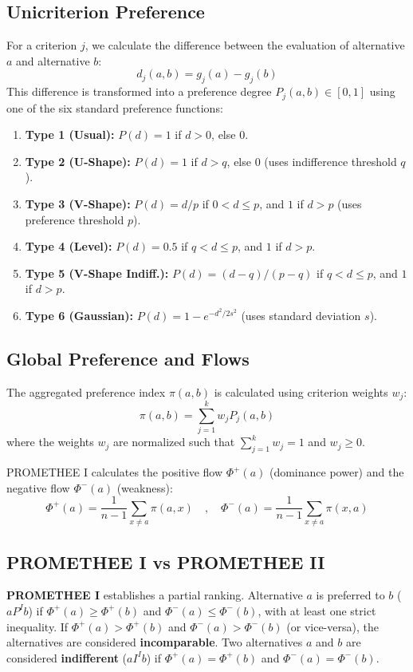 \documentclass[12pt,a4paper,oneside]{report}
\begin{document}
\subsection{Unicriterion Preference}
For a criterion $j$, we calculate the difference between the evaluation of alternative $a$ and alternative $b$:
\begin{equation}
    d_j(a, b) = g_j(a) - g_j(b)
\end{equation}
This difference is transformed into a preference degree $P_j(a,b) \in [0, 1]$ using one of the six standard preference functions:
\begin{enumerate}
    \item \textbf{Type 1 (Usual):} $P(d) = 1$ if $d > 0$, else $0$.
    \item \textbf{Type 2 (U-Shape):} $P(d) = 1$ if $d > q$, else $0$ (uses indifference threshold $q$).
    \item \textbf{Type 3 (V-Shape):} $P(d) = d/p$ if $0 < d \le p$, and $1$ if $d > p$ (uses preference threshold $p$).
    \item \textbf{Type 4 (Level):} $P(d) = 0.5$ if $q < d \le p$, and $1$ if $d > p$.
    \item \textbf{Type 5 (V-Shape Indiff.):} $P(d) = (d-q)/(p-q)$ if $q < d \le p$, and $1$ if $d > p$.
    \item \textbf{Type 6 (Gaussian):} $P(d) = 1 - e^{-d^2/2s^2}$ (uses standard deviation $s$).
\end{enumerate}

\subsection{Global Preference and Flows}
The aggregated preference index $\pi(a,b)$ is calculated using criterion weights $w_j$:
\begin{equation}
    \pi(a, b) = \sum_{j=1}^{k} w_j P_j(a, b)
\end{equation}
where the weights $w_j$ are normalized such that $\sum_{j=1}^{k} w_j = 1$ and $w_j \geq 0$.

PROMETHEE I calculates the positive flow $\Phi^+(a)$ (dominance power) and the negative flow $\Phi^-(a)$ (weakness):
\begin{equation}
    \Phi^+(a) = \frac{1}{n-1} \sum_{x \neq a} \pi(a, x) \quad , \quad \Phi^-(a) = \frac{1}{n-1} \sum_{x \neq a} \pi(x, a)
\end{equation}

\subsection{PROMETHEE I vs PROMETHEE II}
\textbf{PROMETHEE I} establishes a partial ranking. Alternative $a$ is preferred to $b$ ($a P^I b$) if $\Phi^+(a) \ge \Phi^+(b)$ and $\Phi^-(a) \le \Phi^-(b)$, with at least one strict inequality. If $\Phi^+(a) > \Phi^+(b)$ and $\Phi^-(a) > \Phi^-(b)$ (or vice-versa), the alternatives are considered \textbf{incomparable}. Two alternatives $a$ and $b$ are considered \textbf{indifferent} ($a I^I b$) if $\Phi^+(a) = \Phi^+(b)$ and $\Phi^-(a) = \Phi^-(b)$.
\end{document}
